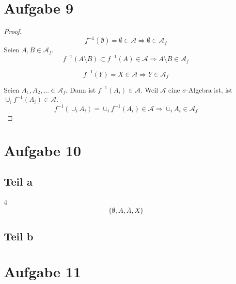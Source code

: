 \documentclass[10pt,a4paper]{article}
\begin{document}
\section{Aufgabe 9}
\begin{proof}
  \begin{equation}
    f^{-1}(\emptyset) = \emptyset \in \mathscr{A} \Rightarrow \emptyset \in \mathscr{A}_{f}
  \end{equation}
  Seien $A, B \in \mathscr{A}_{f}$.
  \begin{equation}
    f^{-1}(A \setminus B) \subset f^{-1}(A) \in \mathscr{A} \Rightarrow A \setminus B \in \mathscr{A}_{f}
  \end{equation}

  \begin{equation}
    f^{-1}(Y) = X \in \mathscr{A} \Rightarrow Y \in \mathscr{A}_{f}
  \end{equation}

  Seien $A_{1}, A_{2}, \dots \in \mathscr{A}_{f}$.
  Dann ist $f^{-1}(A_{i}) \in \mathscr{A}$.
  Weil $\mathscr{A}$ eine $\sigma$-Algebra ist, ist $\cup_{i} f^{-1}(A_{i}) \in \mathscr{A}$.
  \begin{equation}
    f^{-1}(\cup_{i} A_{i}) = \cup_{i} f^{-1}(A_{i}) \in \mathscr{A} \Rightarrow \cup_{i} A_{i} \in \mathscr{A}_{f}
  \end{equation}
\end{proof}

\section{Aufgabe 10}

\subsection{Teil a}
4
\begin{equation}
  \{ \emptyset, A, \overline{A}, X \}
\end{equation}

\subsection{Teil b}

\section{Aufgabe 11}
\end{document}
